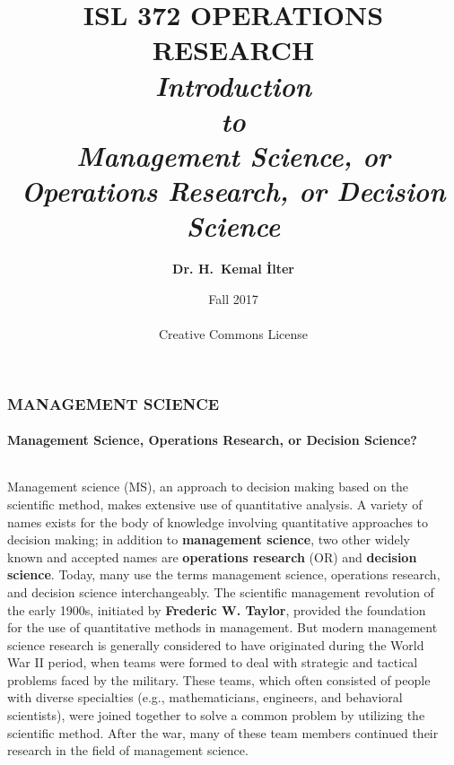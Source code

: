 \documentclass[14 pt]{beamer}
\title[ISL 372]{ISL 372 OPERATIONS RESEARCH\\ \vskip1cm \fontspec{Crimson}
\textit{Introduction\\to\\Management Science, or Operations Research, or Decision Science}}
\date[ilter-desc]{Fall 2017\\ \vskip4cm \ccbyncnd \\ Creative Commons License}
\author[ilter]{\textbf{Dr. H.~Kemal İlter}}
\begin{document}

%
%


\begin{frame}
\titlepage
\end{frame}


\begin{frame}[t]
\frametitle{MANAGEMENT SCIENCE}
\framesubtitle{Management Science, Operations Research, or Decision Science?}

\begin{columns}[t]
\begin{column}{0.45\textwidth}
Management science (MS), an approach to decision making based on the scientific method, makes extensive use of quantitative analysis. A variety of names exists for the body of knowledge involving quantitative approaches to decision making; in addition to \textbf{management science}, two other widely known and accepted names are \textbf{operations research} (OR) and \textbf{decision science}. Today, many use the terms management science, operations research, and decision science interchangeably.
\vskip0.5cm%
The scientific management revolution of the early 1900s, initiated by \textbf{Frederic W. Taylor}, provided the foundation for the use of quantitative methods in management. But modern management science research is generally considered to have originated during the World War II period, when teams were formed to deal with strategic and tactical problems faced by the military. These teams, which often consisted of people with diverse specialties (e.g., mathematicians, engineers, and behavioral scientists), were joined together to solve a common problem by utilizing the scientific method. After the war, many of these team members continued their research in the field of management science.
\end{column}
\begin{column}{0.45\textwidth}
\end{column}
\end{columns}
\end{frame}
\end{document}
